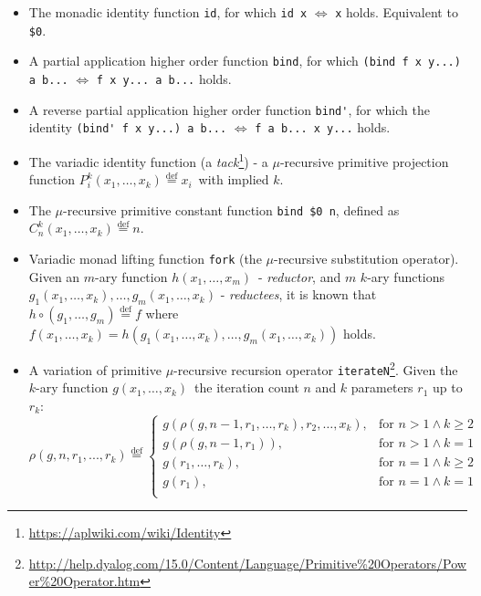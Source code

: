 \begin{itemize}
    \item The monadic identity function \verb|id|, for which \verb|id x| $\Leftrightarrow$ \verb|x| holds. Equivalent to \verb|$0|.
    \item A partial application higher order function \verb|bind|, for which \verb|(bind f x y...) a b...| $\Leftrightarrow$ \verb|f x y... a b...| holds.
    \item A reverse partial application higher order function \verb|bind'|, for which the identity \verb|(bind' f x y...) a b...| $\Leftrightarrow$ \verb|f a b... x y...| holds.
    \item The variadic identity function (a \textit{tack}\footnote{\url{https://aplwiki.com/wiki/Identity}}) - a $\mu$-recursive primitive projection function ${\displaystyle P_{i}^{k}(x_{1},\ldots ,x_{k}){\stackrel {\mathrm {def} }{=}}x_{i}\,}$ with implied $k$.
    \item The $\mu$-recursive primitive constant function \verb|bind $0 n|, defined as ${\displaystyle C_{n}^{k}(x_{1},\ldots ,x_{k}){\stackrel {\mathrm {def} }{=}}n}$.
    \item Variadic monad lifting function \verb|fork| (the $\mu$-recursive substitution operator). Given an $m$-ary function $h(x_{1},\ldots ,x_{m})\,$ - \textit{reductor}, and $m$ $k$-ary functions $g_{1}(x_{1},\ldots ,x_{k}),\ldots ,g_{m}(x_{1},\ldots ,x_{k})$ - \textit{reductees}, it is known that $h \circ (g_{1},\ldots ,g_{m}){\stackrel {\mathrm {def} }{=}}f $ where $ f(x_{1},\ldots ,x_{k})=h(g_{1}(x_{1},\ldots ,x_{k}),\ldots ,g_{m}(x_{1},\ldots ,x_{k}))$ holds.
    \item A variation of primitive $\mu$-recursive recursion operator \verb|iterateN|\footnote{\url{http://help.dyalog.com/15.0/Content/Language/Primitive\%20Operators/Power\%20Operator.htm}}. Given the $k$-ary function $g(x_{1},\ldots ,x_{k})\,$ the iteration count $n$ and $k$ parameters $r_1$ up to $r_k$: \[
        \rho (g,n,r_1,...,r_k){\stackrel {\mathrm {def} }{=}}
          \begin{cases}
            g(\rho(g, n-1, r_1,\ldots , r_k), r_2,\ldots , x_k), & \text{for } n > 1 \wedge k \ge 2 \\
            g(\rho(g, n-1, r_1)), & \text{for } n > 1 \wedge k = 1 \\
            g(r_1,\ldots , r_k), & \text{for } n = 1 \wedge k \ge 2 \\
            g(r_1), & \text{for } n = 1 \wedge k = 1 \\

\end{cases}\]
\end{itemize}
